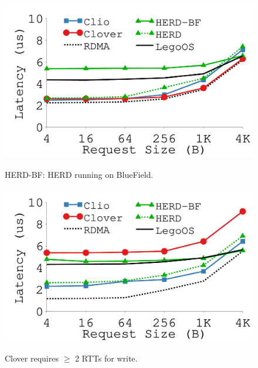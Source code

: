 {\begin{figure}[th]
\begin{minipage}{\figWidthSix}
\begin{center}
\centerline{\includegraphics[width=\columnwidth]{Figures/g_plot_read_latency.pdf}}
\vspace{-0.1in}
\captionsetup{width=.9\columnwidth}
{
HERD-BF: HERD running on BlueField. %
}
\end{center}
\end{minipage}
\begin{minipage}{\figWidthSix}
\begin{center}
\centerline{\includegraphics[width=\columnwidth]{Figures/g_plot_write_latency.pdf}}
\vspace{-0.1in}
\captionsetup{width=.9\columnwidth}
{
Clover requires $\ge$ 2 RTTs for write.
}
\end{center}
\end{minipage}
\end{figure}
}
